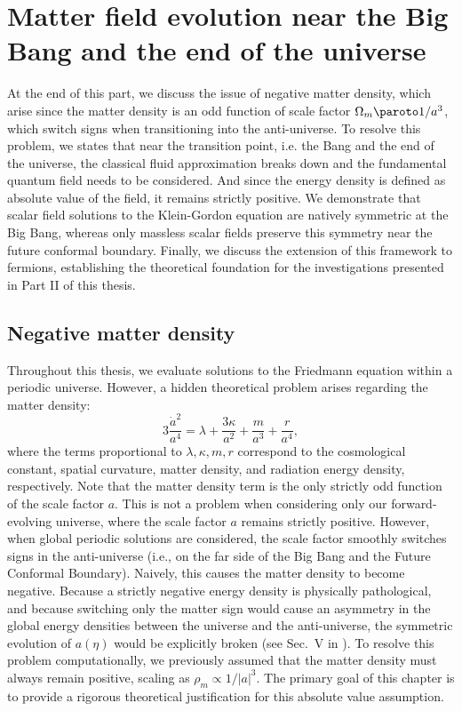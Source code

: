 \section{Matter field evolution near the Big Bang and the end of the universe}\label{sec:matter_evol} 

At the end of this part, we discuss the issue of negative matter density, which arise since the matter density is an odd function of scale factor $\Omega_m\paroto 1/a^3$, which switch signs when transitioning into the anti-universe. To resolve this problem, we states that near the transition point, i.e. the Bang and the end of the universe, the classical fluid approximation breaks down and the fundamental quantum field needs to be considered. And since the energy density is defined as absolute value of the field, it remains strictly positive. We demonstrate that scalar field solutions to the Klein-Gordon equation are natively symmetric at the Big Bang, whereas only massless scalar fields preserve this symmetry near the future conformal boundary. Finally, we discuss the extension of this framework to fermions, establishing the theoretical foundation for the investigations presented in Part II of this thesis.

\subsection{Negative matter density} 

Throughout this thesis, we evaluate solutions to the Friedmann equation within a periodic universe. However, a hidden theoretical problem arises regarding the matter density: 
\[ 3\frac{\dot a^2}{a^4}=\lambda +\frac{3\kappa}{a^2}+\frac{m}{a^3}+\frac{r}{a^4}, \]
where the terms proportional to $\lambda,\kappa,m,r$ correspond to the cosmological constant, spatial curvature, matter density, and radiation energy density, respectively. Note that the matter density term is the only strictly odd function of the scale factor $a$. This is not a problem when considering only our forward-evolving universe, where the scale factor $a$ remains strictly positive. However, when global periodic solutions are considered, the scale factor smoothly switches signs in the anti-universe (i.e., on the far side of the Big Bang and the Future Conformal Boundary). Naively, this causes the matter density to become negative. Because a strictly negative energy density is physically pathological, and because switching only the matter sign would cause an asymmetry in the global energy densities between the universe and the anti-universe, the symmetric evolution of $a(\eta)$ would be explicitly broken (see Sec.~V in \cite{2022PhRvD.105h3514L}). To resolve this problem computationally, we previously assumed that the matter density must always remain positive, scaling as $\rho_m\propto 1/|a|^3$. The primary goal of this chapter is to provide a rigorous theoretical justification for this absolute value assumption.

